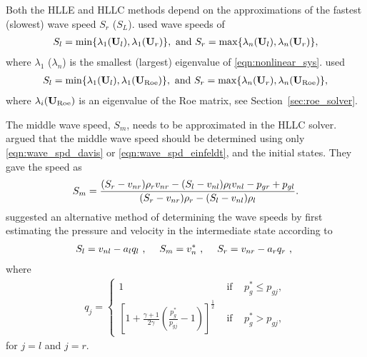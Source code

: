 Both the HLLE and HLLC methods depend on the approximations of the fastest (slowest) wave speed $S_r$ ($S_L$).  \citet{Davis:1988} used wave speeds of 
\begin{gather}
\label{eqn:wave_spd_davis}
S_l = \min \{\lambda_1(\mathbf{U}_l),\lambda_1(\mathbf{U}_r)\}, \text{ and }
S_r = \max \{\lambda_n(\mathbf{U}_l),\lambda_n(\mathbf{U}_r)\},
\end{gather} 
where $\lambda_1$ ($\lambda_n$) is the smallest (largest) eigenvalue of \eqref{eqn:nonlinear_sys}.  \citet{Einfeldt:1991} used 
\begin{gather}
\label{eqn:wave_spd_einfeldt}
S_l = \min \{\lambda_1(\mathbf{U}_l),\lambda_1(\mathbf{U}_{\text{Roe}})\}, \text{ and }
S_r = \max \{\lambda_n(\mathbf{U}_r),\lambda_n(\mathbf{U}_{\text{Roe}})\},
\end{gather} 
where $\lambda_i(\mathbf{U}_{\text{Roe}})$ is an eigenvalue of the Roe matrix, see Section~\ref{sec:roe_solver}.

The middle wave speed, $S_m$, needs to be approximated in the HLLC solver.  \citet{Batten:1997} argued that the middle wave speed should be determined using only  \eqref{eqn:wave_spd_davis} or \eqref{eqn:wave_spd_einfeldt}, and the initial states.  They gave the speed as
\begin{gather}
\label{eqn:wave_spd_batten}
S_m = \frac{(S_r - v_{nr})\rho_r v_{nr} - (S_l - v_{nl})\rho_l v_{nl} - p_{gr} + p_{gl} }
{(S_r - v_{nr})\rho_r  - (S_l - v_{nl})\rho_l}.
\end{gather}     
\citet{Toro:1994} suggested an alternative method of determining the wave speeds by first estimating the pressure and velocity in the intermediate state according to  
\begin{gather}
\label{eqn:wave_spd_toro}
S_l = v_{nl} - a_l q_l \text{ , }\;\;\;\; S_m = v_n^* \text{ , }\;\;\;\; S_r = v_{nr} - a_r q_r \text{ , }
\end{gather}
where
\begin{gather}
\label{eqn:wave_spd_toro2}
q_j = 
\begin{cases}
1 & \text{ if }\;\;\; p_g^* \le p_{gj}, \\ 
\left[ 1 + \frac{\gamma + 1}{2\gamma} \left( \frac{p^*_g}{p_{gj}} - 1 \right) \right]^{\frac{1}{2}} & 
\text{ if }\;\;\; p_g^* > p_{gj},
\end{cases}
\end{gather}
for $j=l$ and $j=r$.

